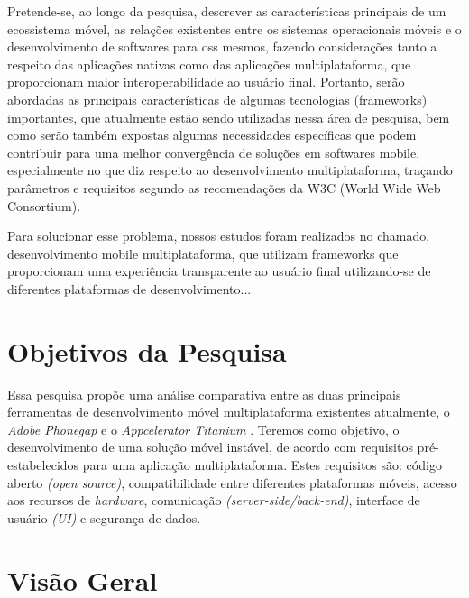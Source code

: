 Pretende-se, ao longo da pesquisa, descrever as características principais de um ecossistema móvel, as
relações existentes entre os sistemas operacionais móveis e o desenvolvimento de softwares para oss
mesmos, fazendo considerações tanto a respeito das aplicações nativas como das aplicações
multiplataforma, que proporcionam maior interoperabilidade ao usuário final. Portanto, serão abordadas as
principais características de algumas tecnologias (frameworks) importantes, que atualmente estão sendo
utilizadas nessa área de pesquisa, bem como serão também expostas algumas necessidades específicas que
podem contribuir para uma melhor convergência de soluções em softwares mobile, especialmente no que diz
respeito ao desenvolvimento multiplataforma, traçando parâmetros e requisitos segundo as recomendações
da W3C (World Wide Web Consortium).

Para solucionar esse problema, nossos estudos foram realizados no
chamado, desenvolvimento mobile multiplataforma, que utilizam frameworks que
proporcionam uma experiência transparente ao usuário final utilizando-se de
diferentes plataformas de desenvolvimento...


\section{Objetivos da Pesquisa} %
\label{sec:objetivos}
Essa pesquisa propõe uma análise comparativa entre as duas principais ferramentas
de desenvolvimento móvel multiplataforma existentes atualmente, o
\textit{Adobe Phonegap} \textsuperscript{\texttrademark} e o
\textit{Appcelerator Titanium} \textsuperscript{\texttrademark}. Teremos como
objetivo, o desenvolvimento de uma solução móvel instável, de acordo com requisitos
pré-estabelecidos para uma aplicação multiplataforma. Estes requisitos são:
código aberto \textit{(open source)}, compatibilidade entre diferentes plataformas
móveis, acesso aos recursos de \textit{hardware}, comunicação
\textit{(server-side/back-end)}, interface de usuário \textit{(UI)} e segurança
de dados.

\section{Visão Geral} %
\label{sec:vis_o_geral}


